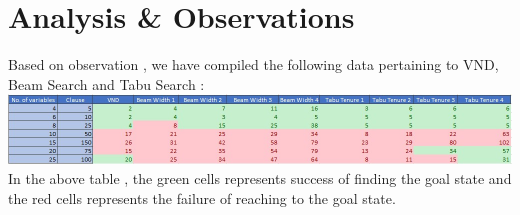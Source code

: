 \documentclass{article}
\begin{document}
\section{Analysis \& Observations}
\vspace{5pt}
Based on observation , we have compiled the following data pertaining to VND, Beam Search and Tabu Search :
\vspace*{10pt}
\\\includegraphics[scale=0.7]{Table1.jpg}
\vspace*{10pt}
\\In the above table , the green cells represents success of finding the goal state and the red cells represents the failure of reaching to the goal state.
\\
\newpage
\end{document}
